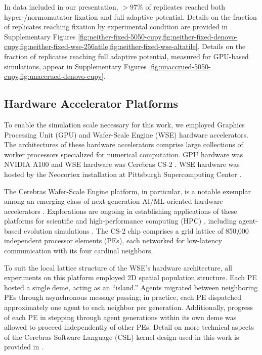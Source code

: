 In data included in our presentation, $>97\%$ of replicates reached both hyper-/normomutator fixation and full adaptive potential.
Details on the fraction of replicates reaching fixation by experimental condition are provided in Supplementary Figures \cref{fig:neither-fixed-5050-cupy,fig:neither-fixed-denovo-cupy,fig:neither-fixed-wse-256atile,fig:neither-fixed-wse-altatile}.
Details on the fraction of replicates reaching full adaptive potential, measured for GPU-based simulations, appear in Supplementary Figures \cref{fig:unaccrued-5050-cupy,fig:unaccrued-denovo-cupy}.

\subsection{Hardware Accelerator Platforms} \label{sec:hardware}

To enable the simulation scale necessary for this work, we employed Graphics Processing Unit (GPU) and Wafer-Scale Engine (WSE) hardware accelerators.
The architectures of these hardware accelerators comprise large collections of worker processors specialized for numerical computation.
GPU hardware was NVIDIA A100 and WSE hardware was Cerebras CS-2 \citep{choquette2021nvidia,cerebras2021wafer}.
WSE hardware was hosted by the Neocortex installation at Pittsburgh Supercomputing Center \citep{buitrago2021neocortex}.

The Cerebras Wafer-Scale Engine platform, in particular, is a notable exemplar among an emerging class of next-generation AI/ML-oriented hardware accelerators \citep{lauterbach2021path}.
Explorations are ongoing in establishing applications of these platforms for scientific and high-performance computing (HPC) \citep{rocki2020fast,brown2023exploring,ltaief2023scaling,sai2023massively,brown2022distributed,luow2020using,woo2022distributed,tramm2024efficient,chen2024using,phillips2023solving,chen2024solving}, including agent-based evolution simulations \citep{moreno2024trackable}.
The CS-2 chip comprises a grid lattice of 850,000 independent processor elements (PEs), each networked for low-latency communication with its four cardinal neighbors.

To suit the local lattice structure of the WSE's hardware architecture, all experiments on this platform employed 2D spatial population structure.
Each PE hosted a single deme, acting as an ``island.''
Agents migrated between neighboring PEs through asynchronous message passing;
in practice, each PE dispatched approximately one agent to each neighbor per generation.
Additionally, progress of each PE in stepping through agent generations within its own deme was allowed to proceed independently of other PEs.
Detail on more technical aspects of the Cerebras Software Language (CSL) kernel design used in this work is provided in \citet{moreno2024trackable}.

